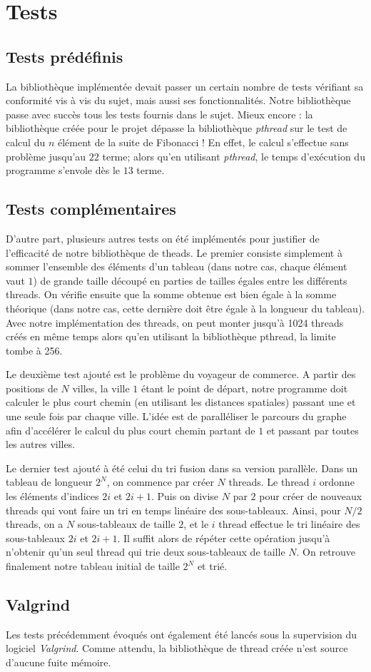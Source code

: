 \section{Tests}

\subsection{Tests prédéfinis}


La bibliothèque implémentée devait passer un certain nombre de tests vérifiant sa conformité vis à vis du sujet, mais aussi ses fonctionnalités. Notre bibliothèque passe avec succès tous les tests fournis dans le sujet.
Mieux encore : la bibliothèque créée pour le projet dépasse la bibliothèque \textit{pthread} sur le test de calcul du $n$ élément de la suite de Fibonacci ! En effet, le calcul s'effectue sans problème jusqu'au $22$ terme; alors qu'en utilisant \textit{pthread}, le temps d'exécution du programme s'envole dès le $13$ terme.


\subsection{Tests complémentaires}

D'autre part, plusieurs autres tests on été implémentés pour justifier de l'efficacité de notre bibliothèque de theads. Le premier consiste simplement à sommer l'ensemble des éléments d'un tableau (dans notre cas, chaque élément vaut $1$) de grande taille découpé en parties de tailles égales entre les différents threads. On vérifie ensuite que la somme obtenue est bien égale à la somme théorique (dans notre cas, cette dernière doit être égale à la longueur du tableau). Avec notre implémentation des threads, on peut monter jusqu'à 1024 threads créés en même temps alors qu'en utilisant la bibliothèque pthread, la limite tombe à 256.

Le deuxième test ajouté est le problème du voyageur de commerce. A partir des positions de $N$ villes, la ville $1$ étant le point de départ, notre programme doit calculer le plus court chemin (en utilisant les distances spatiales) passant une et une seule fois par chaque ville. L'idée est de paralléliser le parcours du graphe afin d'accélérer le calcul du plus court chemin partant de $1$ et passant par toutes les autres villes.

Le dernier test ajouté à été celui du tri fusion dans sa version parallèle. Dans un tableau de longueur $2^{N}$, on commence par créer $N$ threads. Le thread $i$ ordonne les éléments d'indices $2i$ et $2i+1$. Puis on divise $N$ par $2$ pour créer de nouveaux threads qui vont faire un tri en temps linéaire des sous-tableaux. Ainsi, pour $N/2$ threads, on a $N$ sous-tableaux de taille $2$, et le $i$ thread effectue le tri linéaire des sous-tableaux $2i$ et $2i+1$. Il suffit alors de répéter cette opération jusqu'à n'obtenir qu'un seul thread qui trie deux sous-tableaux de taille $N$. On retrouve finalement notre tableau initial de taille $2^{N}$ et trié.


\subsection{Valgrind}
Les tests précédemment évoqués ont également été lancés sous la supervision du logiciel \textit{Valgrind}. Comme attendu, la bibliothèque de thread créée n'est source d'aucune fuite mémoire.
